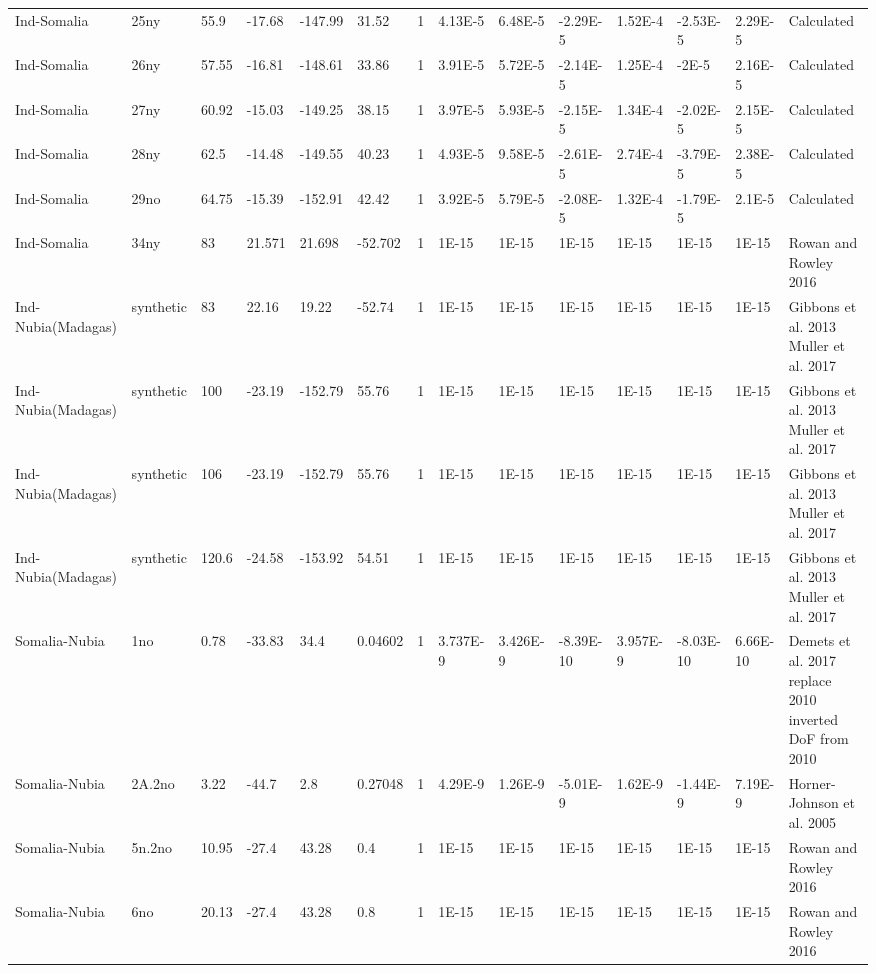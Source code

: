 \begin{landscape}
\begin{longtable}{@{}lllllllllllllp{3.5cm}@{}}
Ind-Somalia & 25ny & 55.9 & -17.68 & -147.99 & 31.52 & 1 & 4.13E-5 & 6.48E-5 & -2.29E-5 & 1.52E-4 & -2.53E-5 & 2.29E-5 & Calculated \\
Ind-Somalia & 26ny & 57.55 & -16.81 & -148.61 & 33.86 & 1 & 3.91E-5 & 5.72E-5 & -2.14E-5 & 1.25E-4 & -2E-5 & 2.16E-5 & Calculated \\
Ind-Somalia & 27ny & 60.92 & -15.03 & -149.25 & 38.15 & 1 & 3.97E-5 & 5.93E-5 & -2.15E-5 & 1.34E-4 & -2.02E-5 & 2.15E-5 & Calculated \\
Ind-Somalia & 28ny & 62.5 & -14.48 & -149.55 & 40.23 & 1 & 4.93E-5 & 9.58E-5 & -2.61E-5 & 2.74E-4 & -3.79E-5 & 2.38E-5 & Calculated \\
Ind-Somalia & 29no & 64.75 & -15.39 & -152.91 & 42.42 & 1 & 3.92E-5 & 5.79E-5 & -2.08E-5 & 1.32E-4 & -1.79E-5 & 2.1E-5 & Calculated \\
Ind-Somalia & 34ny & 83 & 21.571 & 21.698 & -52.702 & 1 & 1E-15 & 1E-15 & 1E-15 & 1E-15 & 1E-15 & 1E-15 & Rowan and Rowley 2016 \\
Ind-Nubia(Madagas) & synthetic & 83 & 22.16 & 19.22 & -52.74 & 1 & 1E-15 & 1E-15 & 1E-15 & 1E-15 & 1E-15 & 1E-15 & Gibbons et al. 2013 Muller et al. 2017 \\
Ind-Nubia(Madagas) & synthetic & 100 & -23.19 & -152.79 & 55.76 & 1 & 1E-15 & 1E-15 & 1E-15 & 1E-15 & 1E-15 & 1E-15 & Gibbons et al. 2013 Muller et al. 2017 \\
Ind-Nubia(Madagas) & synthetic & 106 & -23.19 & -152.79 & 55.76 & 1 & 1E-15 & 1E-15 & 1E-15 & 1E-15 & 1E-15 & 1E-15 & Gibbons et al. 2013 Muller et al. 2017 \\
Ind-Nubia(Madagas) & synthetic & 120.6 & -24.58 & -153.92 & 54.51 & 1 & 1E-15 & 1E-15 & 1E-15 & 1E-15 & 1E-15 & 1E-15 & Gibbons et al. 2013 Muller et al. 2017 \\
Somalia-Nubia & 1no & 0.78 & -33.83 & 34.4 & 0.04602 & 1 & 3.737E-9 & 3.426E-9 & -8.39E-10 & 3.957E-9 & -8.03E-10 & 6.66E-10 & Demets et al. 2017 replace 2010 inverted DoF from 2010 \\
Somalia-Nubia & 2A.2no & 3.22 & -44.7 & 2.8 & 0.27048 & 1 & 4.29E-9 & 1.26E-9 & -5.01E-9 & 1.62E-9 & -1.44E-9 & 7.19E-9 & Horner-Johnson et al. 2005 \\
Somalia-Nubia & 5n.2no & 10.95 & -27.4 & 43.28 & 0.4 & 1 & 1E-15 & 1E-15 & 1E-15 & 1E-15 & 1E-15 & 1E-15 & Rowan and Rowley 2016 \\
Somalia-Nubia & 6no & 20.13 & -27.4 & 43.28 & 0.8 & 1 & 1E-15 & 1E-15 & 1E-15 & 1E-15 & 1E-15 & 1E-15 & Rowan and Rowley 2016 \\

\end{longtable}
\end{landscape}
